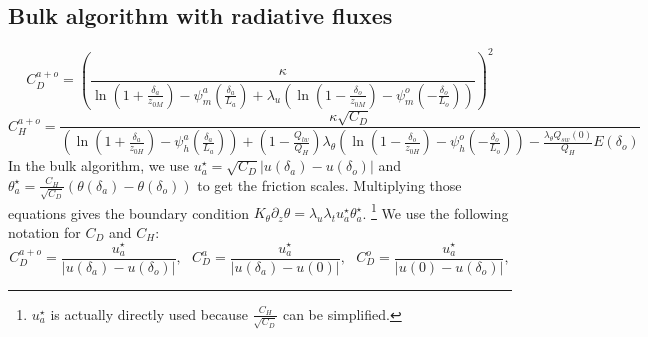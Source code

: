 \subsection{Bulk algorithm with radiative fluxes}
\label{sec:bulkRadiativeFluxes}
\begin{equation}
	C_D^{a+o} = \left(\frac{\kappa} {
		\ln(1 + \frac{\delta_a}{z_{0M}}) -
		\psi_m^a(\frac{\delta_a}{L_a})
		+ \lambda_u \left(
		\ln(1 - \frac{\delta_o}{z_{0M}}) -
		\psi_m^o(-\frac{\delta_o}{L_o})
		\right)
	} \right)^2
\end{equation}
\begin{equation}
	C_H^{a+o} = \frac{\kappa \sqrt{C_D}} {
		\left(
			\ln(1 + \frac{\delta_a}{z_{0H}}) -
			\psi_h^a(\frac{\delta_a}{L_a})
		\right)
		+
		(1 - \frac{Q_{lw}}
		{Q_H})
		\lambda_\theta \left(
			\ln(1 - \frac{\delta_o}{z_{0H}}) -
			\psi_h^o(-\frac{\delta_o}{L_o})
		\right)
		- \frac{\lambda_\theta Q_{sw}(0)}
		{Q_H} E(\delta_o)
	}
\end{equation}
In the bulk algorithm, we use $u_a^\star = \sqrt{C_D} |u(\delta_a)-
u(\delta_o)|$ and
$\theta_a^\star = \frac{C_H}{\sqrt{C_D}}(\theta(\delta_a)-
\theta(\delta_o))$ to get the friction scales.
Multiplying those equations gives the boundary condition
$K_\theta \partial_z \theta = \lambda_u \lambda_t u_a^\star \theta_a^\star$.
\footnote{
$u_a^\star$ is actually directly used because $\frac{C_H}{\sqrt{C_D}}$
can be simplified.
}
We use the following notation for $C_D$ and $C_H$:
\begin{equation}
	C_D^{a+o} = \frac{u_a^\star}{|u(\delta_a) - u(\delta_o)|},
	~~~
	C_D^{a} = \frac{u_a^\star}{|u(\delta_a) - u(0)|},
	~~~
	C_D^{o} = \frac{u_a^\star}{|u(0) - u(\delta_o)|},
\end{equation}
